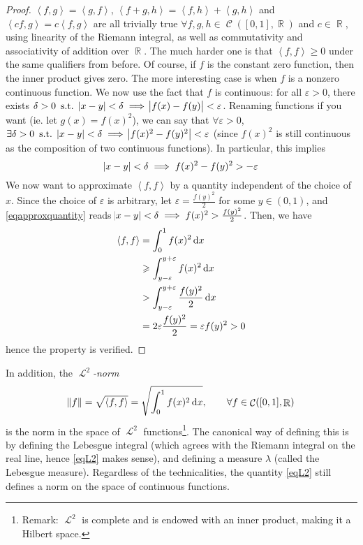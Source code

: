 \documentclass{amsart}
\theoremstyle{definition}
\theoremstyle{definition}
\DeclareMathOperator{\R}{\mathbb{R}}
\DeclareMathOperator{\suchthat}{\text{ s.t. }}
\DeclareMathOperator{\1}{\mathbbm{1}}
\DeclareMathOperator{\LL}{\mathscr{L}}
\DeclareMathOperator{\contf}{\mathcal{C}}
\DeclareMathOperator{\D}{\dif}
\renewcommand{\geq}{\geqslant}
\renewcommand{\epsilon}{\varepsilon}
\newcommand{\innerproduct}[2]{\left\langle #1,#2 \right\rangle}
\begin{document}
\begin{enumerate}
		\begin{proof}
			$\innerproduct{f}{g} = \innerproduct{g}{f}$, $\innerproduct{f+g}{h} = \innerproduct{f}{h} + \innerproduct{g}{h}$ and $\innerproduct{cf}{g} = c\innerproduct{f}{g}$ are all trivially true $\forall f,g,h \in \contf([0,1], \R)$ and $c \in \R$, using linearity of the Riemann integral, as well as commutativity and associativity of addition over $\R$. The much harder one is that $\innerproduct{f}{f} \geq 0$ under the same qualifiers from before. Of course, if $f$ is the constant zero function, then the inner product gives zero. The more interesting case is when $f$ is a nonzero continuous function. We now use the fact that $f$ is continuous: for all $\epsilon >0$, there exists $\delta > 0 \suchthat \abs{x-y} < \delta \implies \abs{f(x)-f(y)} < \epsilon$. Renaming functions if you want (ie. let $g(x) = f(x)^2$), we can say that $\forall \epsilon>0$, $\exists \delta > 0 \suchthat \abs{x-y} < \delta \implies \abs{f(x)^2 - f(y)^2 } < \epsilon$ (since $f(x)^2 $ is still continuous as the composition of two continuous functions). In particular, this implies 
			\begin{equation}
			\label{eqapproxquantity}
			\abs{x-y} < \delta \implies f(x)^2 - f(y)^2 >  - \epsilon 
			\end{equation}
			We now want to approximate $\innerproduct{f}{f}$ by a quantity independent of the choice of $x$. Since the choice of $\epsilon$ is arbitrary, let $\epsilon = \frac{f(y)^2}{2}$ for some $y \in (0,1)$, and \eqref{eqapproxquantity} reads $\abs{x-y} < \delta \implies f(x)^2 > \frac{f(y)^2}{2}$. Then, we have
			\begin{align*}
				\innerproduct{f}{f} &= \int_{0}^{1} f(x)^2 \D x \\
				&\geq \int_{y-\epsilon}^{y+\epsilon} f(x)^2 \D x \\
				&>  \int_{y-\epsilon}^{y+\epsilon} \frac{f(y)^2}{2} \D x \\
				&= 2 \epsilon \frac{f(y)^2}{2} = \epsilon f(y)^2 > 0
			\end{align*}
			hence the property is verified.
		\end{proof}
		
		In addition, the \textit{$\LL^2$-norm}
		\begin{equation}
		\label{eqL2}
		\norm{f} = \sqrt{\innerproduct{f}{f}} = \sqrt{ \int_{0}^{1} f(x)^2 \D x }, \qquad \forall f \in \contf([0,1], \R)
		\end{equation}
		is the norm in the space of $\LL^2$ functions\footnote{Remark: $\LL^2$ is complete and is endowed with an inner product, making it a Hilbert space.}. The canonical way of defining this is by defining the Lebesgue integral (which agrees with the Riemann integral on the real line, hence \eqref{eqL2} makes sense), and defining a measure $\lambda$ (called the Lebesgue measure). Regardless of the technicalities, the quantity \eqref{eqL2} still defines a norm on the space of continuous functions.
		

\end{enumerate}
\end{document}
